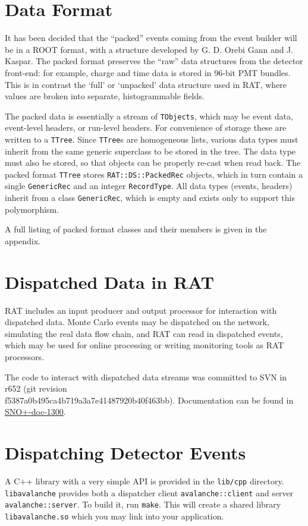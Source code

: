 \documentclass{article}
\begin{document}
\section{Data Format}
It has been decided that the ``packed'' events coming from the event builder will be in a ROOT format, with a structure developed by G. D. Orebi Gann and J. Kaspar. The packed format preserves the ``raw'' data structures from the detector front-end: for example, charge and time data is stored in 96-bit PMT bundles. This is in contrast the `full' or `unpacked' data structure used in RAT, where values are broken into separate, histogrammable fields.

The packed data is essentially a stream of {\tt TObjects}, which may be event data, event-level headers, or run-level headers. For convenience of storage these are written to a {\tt TTree}. Since {\tt TTree}s are homogeneous lists, various data types must inherit from the same generic superclass to be stored in the tree. The data type must also be stored, so that objects can be properly re-cast when read back. The packed format {\tt TTree} stores {\tt RAT::DS::PackedRec} objects, which in turn contain a single {\tt GenericRec} and an integer {\tt RecordType}. All data types (events, headers) inherit from a class {\tt GenericRec}, which is empty and exists only to support this polymorphism.

A full listing of packed format classes and their members is given in the appendix.

\section{Dispatched Data in RAT}
RAT includes an input producer and output processor for interaction with dispatched data. Monte Carlo events may be dispatched on the network, simulating the real data flow chain, and RAT can read in dispatched events, which may be used for online processing or writing monitoring tools as RAT processors.

The code to interact with dispatched data streams was committed to SVN in r652 (git revision\\ f5387a0b495ca4b719a3a7e41487920b40f463bb). Documentation can be found in \href{https://www.snolab.ca/snoplus/private/DocDB/cgi/ShowDocument?docid=1300}{SNO+-doc-1300}.

\section{Dispatching Detector Events}
A C++ library with a very simple API is provided in the {\tt lib/cpp} directory. {\tt libavalanche} provides both a dispatcher client {\tt avalanche::client} and server {\tt avalanche::server}. To build it, run {\tt make}. This will create a shared library {\tt libavalanche.so} which you may link into your application.
\end{document}
